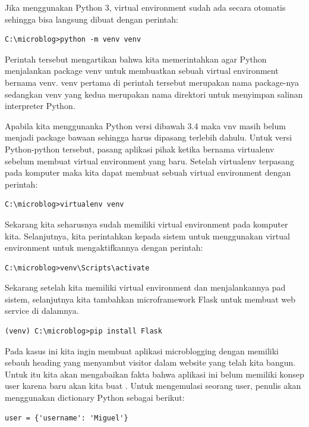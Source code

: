 Jika menggunakan Python 3, virtual environment sudah ada secara otomatis sehingga bisa langsung dibuat dengan perintah:

\begin{verbatim}
C:\microblog>python -m venv venv
\end{verbatim}

Perintah tersebut mengartikan bahwa kita memerintahkan agar Python menjalankan package venv untuk membuatkan sebuah virtual environment bernama venv. venv pertama di perintah tersebut merupakan nama package-nya sedangkan venv yang kedua merupakan nama direktori untuk menyimpan salinan interpreter Python.

Apabila kita menggunanka Python versi dibawah 3.4 maka vnv masih belum menjadi package bawaan sehingga harus dipasang terlebih dahulu. Untuk versi Python-python tersebut, pasang aplikasi pihak ketika bernama virtualenv sebelum membuat virtual environment yang baru. Setelah virtualenv terpasang pada komputer maka kita dapat membuat sebuah virtual environment dengan perintah:

\begin{verbatim}
C:\microblog>virtualenv venv
\end{verbatim}

Sekarang kita seharusnya sudah memiliki virtual environment pada komputer kita. Selanjutnya, kita perintahkan kepada sistem untuk menggunakan virtual environment untuk mengaktifkannya dengan perintah:

\begin{verbatim}
C:\microblog>venv\Scripts\activate

\end{verbatim}

Sekarang setelah kita memiliki virtual environment dan menjalankannya pad sistem, selanjutnya kita tambahkan microframework Flask untuk membuat web service di dalamnya.

\begin{verbatim}
(venv) C:\microblog>pip install Flask
\end{verbatim}

Pada kasus ini kita ingin membuat aplikasi microblogging dengan memiliki sebauh heading yang menyambut visitor dalam website yang telah kita bangun. Untuk itu kita akan mengabaikan fakta bahwa aplikasi ini belum memiliki konsep user karena baru akan kita buat . Untuk mengemulasi seorang user, penulis akan menggunakan dictionary Python sebagai berikut:

\begin{verbatim}
user = {'username': 'Miguel'}
\end{verbatim}

